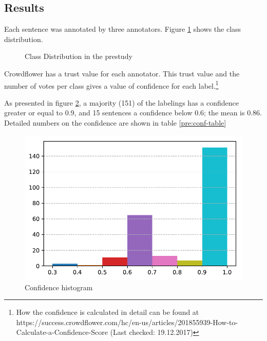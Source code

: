 \label{sec:annotation-guidelines}
\subsection{Results}
Each sentence was annotated by three annotators. Figure \ref{pre:dist} shows the class distribution.

\begin{figure}[h]
\centering
\caption{Class Distribution in the prestudy}
\label{pre:dist}
\end{figure}




Crowdflower has a trust value for each annotator. This trust value and the number of votes per class gives a value of confidence for each label.\footnote{How the confidence is calculated in detail can be found at https://success.crowdflower.com/hc/en-us/articles/201855939-How-to-Calculate-a-Confidence-Score (Last checked: 19.12.2017)}


As presented in figure \ref{pre:conf}, a majority (151) of the labelings has a confidence greater or equal to 0.9, and 15 sentences a confidence below 0.6; the mean is 0.86. Detailed numbers on the confidence are shown in table \ref{pre:conf-table}

\begin{figure}
\centering
\caption{Confidence histogram}
\label{pre:conf}
\includegraphics[scale=0.6]{images/prestudy/confidence.pdf}
\end{figure}


